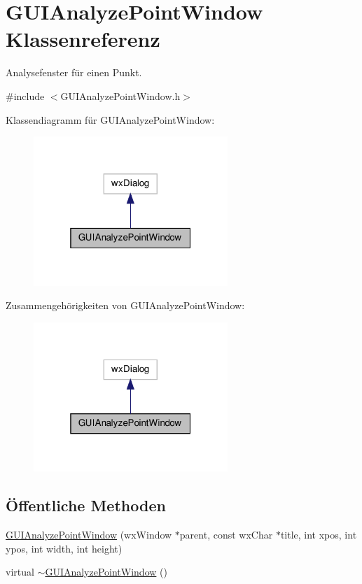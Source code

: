\hypertarget{classGUIAnalyzePointWindow}{\section{G\-U\-I\-Analyze\-Point\-Window Klassenreferenz}
\label{classGUIAnalyzePointWindow}
}


Analysefenster für einen Punkt.  




{\ttfamily \#include $<$G\-U\-I\-Analyze\-Point\-Window.\-h$>$}



Klassendiagramm für G\-U\-I\-Analyze\-Point\-Window\-:\nopagebreak
\begin{figure}[H]
\begin{center}
\leavevmode
\includegraphics[width=208pt]{classGUIAnalyzePointWindow__inherit__graph}
\end{center}
\end{figure}


Zusammengehörigkeiten von G\-U\-I\-Analyze\-Point\-Window\-:\nopagebreak
\begin{figure}[H]
\begin{center}
\leavevmode
\includegraphics[width=208pt]{classGUIAnalyzePointWindow__coll__graph}
\end{center}
\end{figure}
\subsection*{Öffentliche Methoden}
\begin{DoxyCompactItemize}
\item 
\hyperlink{classGUIAnalyzePointWindow_abf699fcd4ffb8bec8b0565e6404b0af3}{G\-U\-I\-Analyze\-Point\-Window} (wx\-Window $\ast$parent, const wx\-Char $\ast$title, int xpos, int ypos, int width, int height)
\item 
virtual \hyperlink{classGUIAnalyzePointWindow_a9edaece1fef847902309af1f63eb168a}{$\sim$\-G\-U\-I\-Analyze\-Point\-Window} ()
\end{DoxyCompactItemize}
